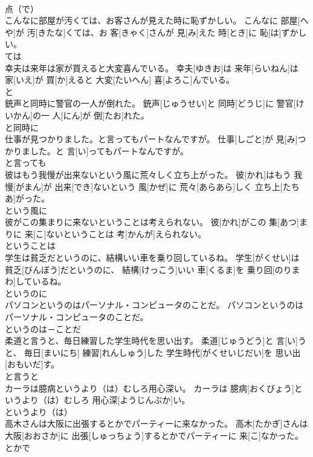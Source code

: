\documentclass[8pt]{extreport}
\begin{document}
\begin{CJK}{UTF8}{min}
\\	点（で）	
\\	こんなに部屋が汚くては、お客さんが見えた時に恥ずかしい。	こんなに 部屋[へや]が 汚[きたな]くては、お 客[きゃく]さんが 見[み]えた 時[とき]に 恥[は]ずかしい。	
\\	ては	
\\	幸夫は来年は家が買えると大変喜んでいる。	幸夫[ゆきお]は 来年[らいねん]は 家[いえ]が 買[か]えると 大変[たいへん] 喜[よろこ]んでいる。	
\\	と	
\\	銃声と同時に警官の一人が倒れた。	銃声[じゅうせい]と 同時[どうじ]に 警官[けいかん]の一 人[にん]が 倒[たお]れた。	
\\	と同時に	
\\	仕事が見つかりました。と言ってもパートなんですが。	仕事[しごと]が 見[み]つかりました。と 言[い]ってもパートなんですが。	
\\	と言っても	
\\	彼はもう我慢が出来ないという風に荒々しく立ち上がった。	彼[かれ]はもう 我慢[がまん]が 出来[でき]ないという 風[かぜ]に 荒々[あらあら]しく 立ち上[たちあ]がった。	
\\	という風に	
\\	彼がこの集まりに来ないということは考えられない。	彼[かれ]がこの 集[あつ]まりに 来[こ]ないということは 考[かんが]えられない。	
\\	ということは	
\\	学生は貧乏だというのに、結構いい車を乗り回しているね。	学生[がくせい]は 貧乏[びんぼう]だというのに、 結構[けっこう]いい 車[くるま]を 乗り回[のりまわ]しているね。	
\\	というのに	
\\	パソコンというのはパーソナル・コンピュータのことだ。	パソコンというのはパーソナル・コンピュータのことだ。	
\\	というのは－ことだ	
\\	柔道と言うと、毎日練習した学生時代を思い出す。	柔道[じゅうどう]と 言[い]うと、 毎日[まいにち] 練習[れんしゅう]した 学生時代[がくせいじだい]を 思い出[おもいだ]す。	
\\	と言うと	
\\	カーラは臆病というより（は）むしろ用心深い。	カーラは 臆病[おくびょう]というより（は）むしろ 用心深[ようじんぶか]い。	
\\	というより（は）	
\\	高木さんは大阪に出張するとかでパーティーに来なかった。	高木[たかぎ]さんは 大阪[おおさか]に 出張[しゅっちょう]するとかでパーティーに 来[こ]なかった。	
\\	とかで	

\end{CJK}
\end{document}
